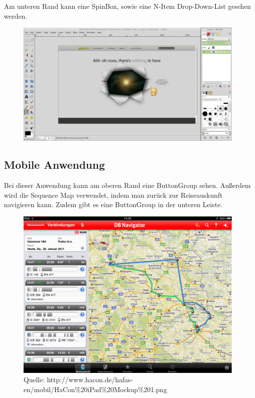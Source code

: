 \documentclass[a4paper,10pt]{scrartcl}
\begin{document}
Am unteren Rand kann eine SpinBox, sowie eine N-Item Drop-Down-List gesehen werden.
 
\begin{figure}[htp]
	\includegraphics[scale=0.35]{ID-Gimp}
\end{figure}

\newpage
\subsection*{Mobile Anwendung}

Bei dieser Anwendung kann am oberen Rand eine ButtonGroup sehen. Außerdem wird die Sequence Map verwendet, indem man zurück zur Reiseauskunft navigieren kann. Zudem gibt es eine ButtonGroup in der unteren Leiste.

\begin{figure}[htp]
	\includegraphics[scale=0.40]{ID-DBNavigator}
	\caption{Quelle: http://www.hacon.de/hafas-en/mobil/HaCon\%20iPad\%20Mockup\%201.png}
\end{figure}
\end{document}
